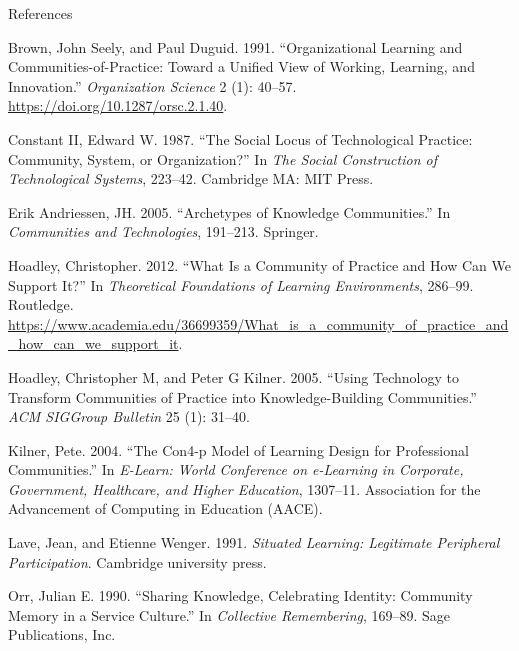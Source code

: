 \documentclass[
  ignorenonframetext,
]{beamer}
\newlength{\cslhangindent}
\newlength{\cslentryspacingunit} %
\newenvironment{CSLReferences}[2] %
 {%
  \setlength{\parindent}{0pt}
  \ifodd #1
  \let\oldpar\par
  \def\par{\hangindent=\cslhangindent\oldpar}
  \fi
  \setlength{\parskip}{#2\cslentryspacingunit}
 }%
 {}
\begin{document}
\begin{frame}{References}
\protect\hypertarget{references}{}
\hypertarget{refs}{}
\begin{CSLReferences}{1}{0}
\leavevmode{}%
Brown, John Seely, and Paul Duguid. 1991. {``Organizational Learning and
Communities-of-Practice: Toward a Unified View of Working, Learning, and
Innovation.''} \emph{Organization Science} 2 (1): 40--57.
\url{https://doi.org/10.1287/orsc.2.1.40}.

\leavevmode{}%
Constant II, Edward W. 1987. {``The Social Locus of Technological
Practice: Community, System, or Organization?''} In \emph{The Social
Construction of Technological Systems}, 223--42. Cambridge MA: MIT
Press.

\leavevmode{}%
Erik Andriessen, JH. 2005. {``Archetypes of Knowledge Communities.''} In
\emph{Communities and Technologies}, 191--213. Springer.

\leavevmode{}%
Hoadley, Christopher. 2012. {``What Is a Community of Practice and How
Can We Support It?''} In \emph{Theoretical Foundations of Learning
Environments}, 286--99. Routledge.
\url{https://www.academia.edu/36699359/What_is_a_community_of_practice_and_how_can_we_support_it}.

\leavevmode{}%
Hoadley, Christopher M, and Peter G Kilner. 2005. {``Using Technology to
Transform Communities of Practice into Knowledge-Building
Communities.''} \emph{ACM SIGGroup Bulletin} 25 (1): 31--40.

\leavevmode{}%
Kilner, Pete. 2004. {``The Con4-p Model of Learning Design for
Professional Communities.''} In \emph{E-Learn: World Conference on
e-Learning in Corporate, Government, Healthcare, and Higher Education},
1307--11. Association for the Advancement of Computing in Education
(AACE).

\leavevmode{}%
Lave, Jean, and Etienne Wenger. 1991. \emph{Situated Learning:
Legitimate Peripheral Participation}. Cambridge university press.

\leavevmode{}%
Orr, Julian E. 1990. {``Sharing Knowledge, Celebrating Identity:
Community Memory in a Service Culture.''} In \emph{Collective
Remembering}, 169--89. Sage Publications, Inc.


\end{CSLReferences}
\end{frame}
\end{document}
